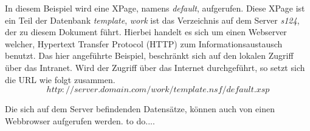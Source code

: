 In diesem Beispiel wird eine XPage, namens \textit{default}, aufgerufen. Diese XPage ist ein Teil der Datenbank \textit{template}, \textit{work} ist das
Verzeichnis auf dem Server \textit{s124}, der zu diesem Dokument führt. Hierbei handelt es sich um einen Webserver welcher, Hypertext Transfer Protocol
(HTTP) zum Informationsaustausch benutzt. Das hier angeführte Beispiel, beschränkt sich auf den lokalen Zugriff über das Intranet.\newline
 Wird der Zugriff über das Internet durchgeführt, so setzt sich die URL wie folgt zusammen.
\begin{equation}
http://server.domain.com/work/template.nsf/default.xsp
\end{equation} 


Die sich auf dem Server befindenden Datensätze, können auch von einen Webbrowser aufgerufen werden. 
 to do....






